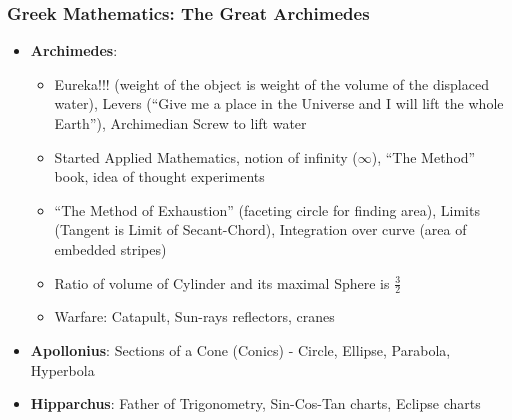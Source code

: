 \begin{frame}[fragile]
\frametitle{Greek Mathematics: The Great Archimedes}
\begin{itemize}[label=\textbullet,noitemsep,nolistsep]
\item \textbf{Archimedes}: 
	\begin{itemize}[label=\textbullet,noitemsep,nolistsep]
	\item Eureka!!! (weight of the object is weight of the volume of the displaced water), Levers (``Give me a place in the Universe and I will lift the whole Earth''), 	Archimedian Screw to lift water
	\item Started Applied Mathematics, notion of infinity ($\infty$), ``The Method'' book, idea of thought experiments
	\item ``The Method of Exhaustion'' (faceting circle for finding area), Limits (Tangent is Limit of Secant-Chord), Integration over curve (area of embedded stripes)
	\item Ratio of volume of Cylinder and its maximal Sphere is $\frac{3}{2}$
	\item Warfare: Catapult, Sun-rays reflectors, cranes
	\end{itemize}
\item \textbf{Apollonius}: Sections of a Cone (Conics) - Circle, Ellipse, Parabola, Hyperbola
\item \textbf{Hipparchus}: Father of Trigonometry, Sin-Cos-Tan charts, Eclipse charts 
\end{itemize}
\end{frame}

